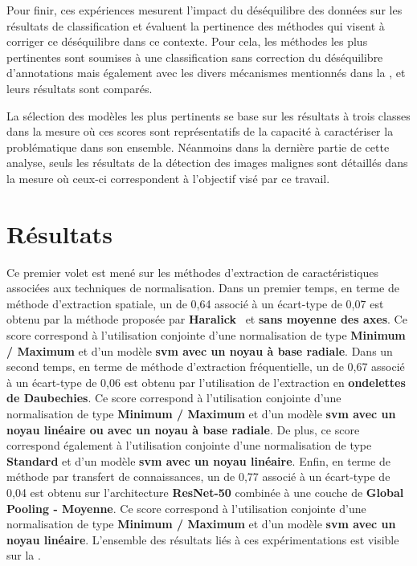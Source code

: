Pour finir, ces expériences mesurent l'impact du déséquilibre des données sur les résultats de classification et évaluent la pertinence des méthodes qui visent à corriger ce déséquilibre dans ce contexte. Pour cela, les méthodes les plus pertinentes sont soumises à une classification sans correction du déséquilibre d'annotations mais également avec les divers mécanismes mentionnés dans la , et leurs résultats sont comparés.\par

La sélection des modèles les plus pertinents se base sur les résultats à trois classes dans la mesure où ces scores sont représentatifs de la capacité à caractériser la problématique dans son ensemble. Néanmoins dans la dernière partie de cette analyse, seuls les résultats de la détection des images malignes sont détaillés dans la mesure où ceux-ci correspondent à l'objectif visé par ce travail.\par

\addtocounter{footnote}{1}
\clearpage

\section{Résultats}
Ce premier volet est mené sur les méthodes d'extraction de caractéristiques associées aux techniques de normalisation. Dans un premier temps, en terme de méthode d'extraction spatiale, un \fscore{} de 0,64 associé à un écart-type de 0,07 est obtenu par la méthode proposée par \textbf{Haralick}~ et \textbf{sans moyenne des axes}. Ce score correspond à l'utilisation conjointe d'une normalisation de type \textbf{Minimum / Maximum} et d'un modèle \textbf{\gls{svm} avec un noyau à base radiale}. Dans un second temps, en terme de méthode d'extraction fréquentielle, un \fscore{} de 0,67 associé à un écart-type de 0,06 est obtenu par l'utilisation de l'extraction en \textbf{ondelettes de Daubechies}. Ce score correspond à l'utilisation conjointe d'une normalisation de type \textbf{Minimum / Maximum} et d'un modèle \textbf{\gls{svm} avec un noyau linéaire ou avec un noyau à base radiale}. De plus, ce score correspond également à l'utilisation conjointe d'une normalisation de type \textbf{Standard} et d'un modèle \textbf{\gls{svm} avec un noyau linéaire}. Enfin, en terme de méthode par transfert de connaissances, un \fscore{} de 0,77 associé à un écart-type de 0,04 est obtenu sur l'architecture \textbf{ResNet-50} combinée à une couche de \textbf{Global Pooling - Moyenne}. Ce score correspond à l'utilisation conjointe d'une normalisation de type \textbf{Minimum / Maximum} et d'un modèle \textbf{\gls{svm} avec un noyau linéaire}. L'ensemble des résultats liés à ces expérimentations est visible sur la .\par

